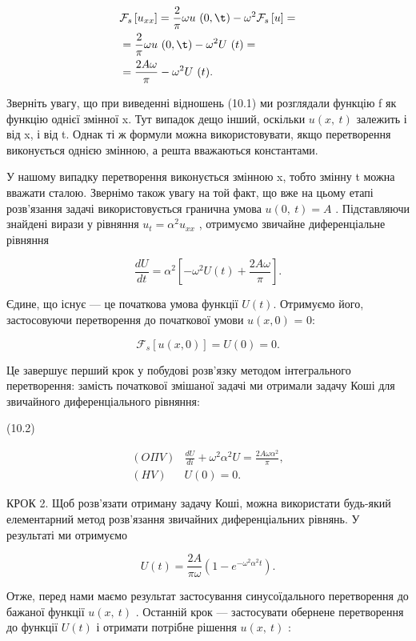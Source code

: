 \documentclass[
  ukrainian,
]{article}
\begin{document}
\[
\begin{split} &\mathcal{F}_s\left[u_{xx}\right] = \frac{2}{\pi} \omega u \ (0, \t) - \omega^2 \mathcal{F}_s\left[u\right] = \\ &= \frac{2}{\pi} \omega u \ (0, \t) - \omega^2 U \ (t) = \\ &= \frac{2A\omega}{\pi} - \omega^2 U \ (t). \end{split}
\]

Зверніть увагу, що при виведенні відношень (10.1) ми розглядали функцію
f як функцію однієї змінної x. Тут випадок дещо інший, оскільки
\(u\left(x,\ t\right)\) залежить і від x, і від t. Однак ті ж формули
можна використовувати, якщо перетворення виконується однією змінною, а
решта вважаються константами.

У нашому випадку перетворення виконується змінною x, тобто змінну t
можна вважати сталою. Звернімо також увагу на той факт, що вже на цьому
етапі розв'язання задачі використовується гранична умова
\(u\left(0,\ t\right)=A\) . Підставляючи знайдені вирази у рівняння
\(u_{t}=\alpha^{2}u_{xx}\) , отримуємо звичайне диференціальне рівняння

\[
\frac{dU}{dt} = \alpha^2 \left[ -\omega^2 U(t) + \frac{2A\omega}{\pi} \right].
\]

Єдине, що існує --- це початкова умова функції \(U(t)\). Отримуємо його,
застосовуючи перетворення до початкової умови \(u(x, 0)\) = 0:

\[
\mathcal{F}_{s}[u(x, 0)] = U(0) = 0.
\]

Це завершує перший крок у побудові розв'язку методом інтегрального
перетворення: замість початкової змішаної задачі ми отримали задачу Коші
для звичайного диференціального рівняння:

(10.2)

\[
\begin{aligned} (O \Pi V) & \frac{dU}{di} + \omega^2 \alpha^2 U = \frac{2A\omega \alpha^2}{\pi}, \\ (H V) & U(0) = 0. \end{aligned}
\]

КРОК 2. Щоб розв'язати отриману задачу Коші, можна використати будь-який
елементарний метод розв'язання звичайних диференціальних рівнянь. У
результаті ми отримуємо

\[
U(t) = \frac{2A}{\pi\omega} (1 - e^{-\omega^2 \alpha^2 t}).
\]

Отже, перед нами маємо результат застосування синусоїдального
перетворення до бажаної функції \(u\left(x,\ t\right)\) . Останній крок
--- застосувати обернене перетворення до функції \(U\left(t\right)\) і
отримати потрібне рішення \(u\left(x,\ t\right)\) :
\end{document}
